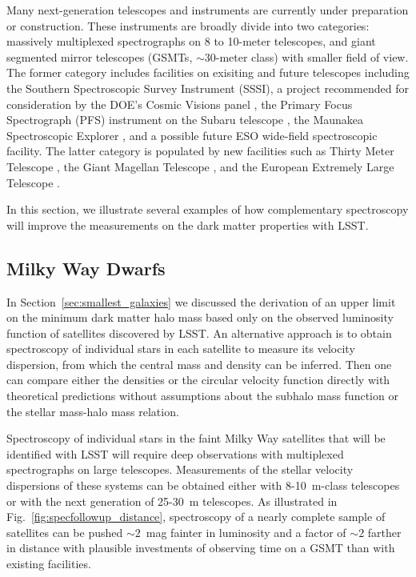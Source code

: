 Many next-generation telescopes and instruments are currently under preparation or construction. These instruments are broadly divide into two categories: massively multiplexed spectrographs on 8 to 10-meter telescopes, and giant segmented mirror telescopes (GSMTs, $\sim30$-meter class) with smaller field of view. The former category includes facilities on exisiting and future telescopes including the Southern Spectroscopic Survey Instrument (SSSI), a project recommended for consideration by the DOE’s Cosmic Visions panel \citep{1604.07626, 1604.07821}, the Primary Focus Spectrograph (PFS) instrument on the Subaru telescope \citep{2014PASJ...66R...1T}, the Maunakea Spectroscopic Explorer \citep[MSE;][]{MSEbook2018}, and a possible future ESO wide-field spectroscopic facility. 
The latter category is populated by new facilities such as Thirty Meter Telescope \citep[TMT;][]{1505.01195}, the Giant Magellan Telescope \citep[GMT;][]{GMT:2018}, and the European Extremely Large Telescope \citep[E-ELT;][]{EELT:2009}. 

In this section, we illustrate several examples of how complementary spectroscopy will improve the measurements on the dark matter properties with LSST.

\subsection{Milky Way Dwarfs }
In Section~\ref{sec:smallest_galaxies} we discussed the derivation of an upper limit on the minimum dark matter halo mass based only on the observed luminosity function of satellites discovered by LSST.   An alternative approach is to obtain spectroscopy of individual stars in each satellite to measure its velocity dispersion, from which the central mass and density can be inferred.  Then one can compare either the densities or the circular velocity function directly with theoretical predictions without assumptions about the subhalo mass function or the stellar mass-halo mass relation.

Spectroscopy of individual stars in the faint Milky Way satellites that will be identified with LSST will require deep observations with multiplexed spectrographs on large telescopes.  Measurements of the stellar velocity dispersions of these systems can be obtained either with 8-10~m-class telescopes or with the next generation of 25-30~m telescopes.  As illustrated in Fig.~\ref{fig:specfollowup_distance}, spectroscopy of a nearly complete sample of satellites can be pushed $\sim2$~mag fainter in luminosity and a factor of $\sim2$ farther in distance with plausible investments of observing time on a GSMT than with existing facilities.


